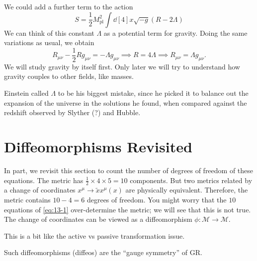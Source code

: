 We could add a further term to the action
\begin{equation}
  S = \frac{1}{2} M^2_{\text{pl}} \int \dd[4]{x} \sqrt{-g} \left( R - 2 \Lambda \right)
\end{equation}
We can think of this constant $\Lambda$ as a potential term for gravity.
Doing the same variations as usual, we obtain
\begin{equation}
  R_{\mu\nu} - \frac{1}{2} R g_{\mu\nu} = - \Lambda g_{\mu\nu} \implies R = 4 \Lambda \implies R_{\mu\nu} = \Lambda g_{\mu\nu}.
  \label{eq:13-1}
\end{equation}
We will study gravity by itself first. Only later we will try to understand how gravity couples to other fields, like masses.
\begin{leftbar}
  \begin{remark}
    Einstein called $\Lambda$ to be his biggest mistake, since he picked it to balance out the expansion of the universe in the solutions he found, when compared against the redshift observed by Slyther (?) and Hubble.
  \end{remark}
\end{leftbar}

\section{Diffeomorphisms Revisited}%
\label{sec:diffeomorphisms_revisited}

In part, we revisit this section to count the number of degrees of freedom of these equations.
The metric has $\frac{1}{2} \times 4 \times 5 = 10$ components.
But two metrics related by a change of coordinates $x^{\mu} \to \widetilde{x}x^{\mu}(x)$ are physically equivalent. Therefore, the metric contains $10 - 4 = 6$ degrees of freedom.
You might worry that the $10$ equations of \eqref{eq:13-1} over-determine the metric; we will see that this is not true.
The change of coordinates can be viewed as a diffeomorphism $\phi \colon \mathcal{M} \to \mathcal{M}$.
\begin{leftbar}
  \begin{remark}
    This is a bit like the active vs passive transformation issue.
  \end{remark}
\end{leftbar}
Such diffeomorphisms (diffeos) are the ``gauge symmetry'' of GR.
